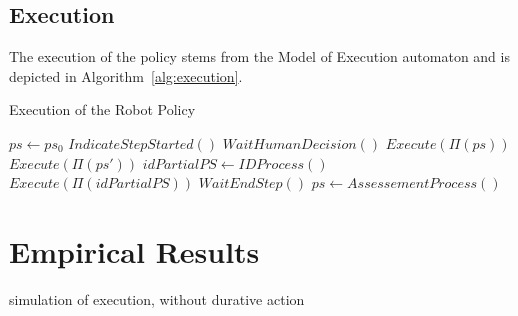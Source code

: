 

    \subsection{Execution}

The execution of the policy stems from the Model of Execution automaton and is depicted in Algorithm~\ref{alg:execution}.

\begin{algorithm}
\caption{Execution of the Robot Policy }\label{alg:execution}
\begin{algorithmic}[1]

\State $ps \gets ps_0$ 
    \State $IndicateStepStarted()$ 
    \State $WaitHumanDecision()$
     
        \State $Execute(\Pi(ps))$
    \Else
         
            \State $Execute(\Pi(ps'))$
        \Else
            \State $idPartialPS \gets IDProcess()$ 
            \State $Execute(\Pi(idPartialPS))$
        \EndIf
    \EndIf
    \State $WaitEndStep()$ 
    \State $ps \gets AssessementProcess()$ 
\EndWhile

\end{algorithmic}
\end{algorithm}

\section{Empirical Results}
simulation of execution, without durative action

